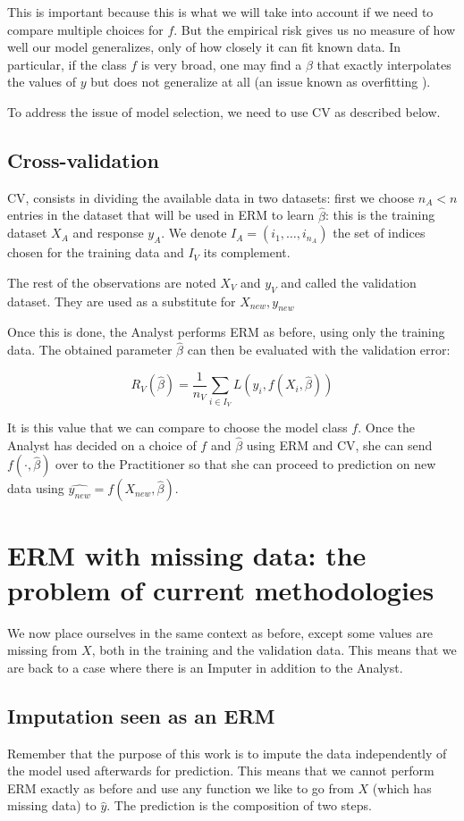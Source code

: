  This is important because this is what we will take into account if we need to compare multiple choices for $f$. But the empirical risk gives us no measure of how well our model generalizes, only of how closely it can fit known data. In particular, if the class $f$ is very broad, one may find a $\beta$ that exactly interpolates the values of $y$ but does not generalize at all (an issue known as overfitting \cite{hawkins2004overfitting}).

To address the issue of model selection, we need to use CV as described below.

		\subsection{Cross-validation}
CV, consists in dividing the available data in two datasets: first we choose $n_A < n$ entries in the dataset that will be used in ERM to learn $\hat{\beta}$: this is the training dataset $X_A$ and response $y_A$. We denote $I_A = (i_1, \ldots, i_{n_A})$ the set of indices chosen for the training data and $I_V$ its complement.

The rest of the observations are noted $X_V$ and $y_V$ and called the validation dataset. They are used as a substitute for $X_{new},y_{new}$

Once this is done, the Analyst performs ERM as before, using only the training data. The obtained parameter $\hat{\beta}$ can then be evaluated with the validation error:

$$ R_{V}(\hat{\beta}) = \frac{1}{n_V} \sum\limits_{i \in I_V} L(y_i, f(X_i, \hat{\beta}))$$

It is this value that we can compare to choose the model class $f$. Once the Analyst has decided on a choice of $f$ and $\hat{\beta}$ using ERM and CV, she can send $f(\cdot, \hat{\beta})$ over to the Practitioner so that she can proceed to prediction on new data using $\hat{y_{new}} = f(X_{new}, \hat{\beta})$.

	\section{ERM with missing data: the problem of current methodologies}
	\label{ERM.imp}
We now place ourselves in the same context as before, except some values are missing from $X$, both in the training and the validation data. This means that we are back to a case where there is an Imputer in addition to the Analyst.
		\subsection{Imputation seen as an ERM}
Remember that the purpose of this work is to impute the data independently of the model used afterwards for prediction. This means that we cannot perform ERM exactly as before and use any function we like to go from $X$ (which has missing data) to $\hat{y}$. The prediction is the composition of two steps.
